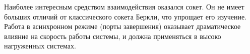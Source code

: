 \documentclass[a4paper, 12pt]{report}		%
\begin{document}
\vspace{1em}

Наиболее интересным средством взаимодействия оказался сокет. Он не имеет больших отличий от классического сокета Беркли, что упрощает его изучение. Работа в асинхронном режиме (порты завершения) оказывает драматическое влияние на скорость работы системы, и должна применяться в высоко нагруженных системах.
\end{document}
